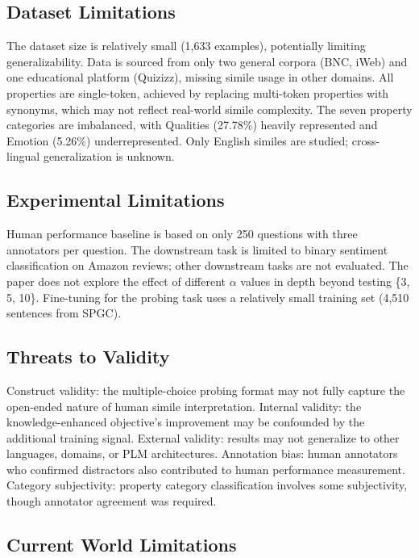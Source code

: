 \documentclass[12pt]{article}
\begin{document}
\subsection{Dataset Limitations}

The dataset size is relatively small (1,633 examples), potentially limiting generalizability. Data is sourced from only two general corpora (BNC, iWeb) and one educational platform (Quizizz), missing simile usage in other domains. All properties are single-token, achieved by replacing multi-token properties with synonyms, which may not reflect real-world simile complexity. The seven property categories are imbalanced, with Qualities (27.78\%) heavily represented and Emotion (5.26\%) underrepresented. Only English similes are studied; cross-lingual generalization is unknown.

\subsection{Experimental Limitations}

Human performance baseline is based on only 250 questions with three annotators per question. The downstream task is limited to binary sentiment classification on Amazon reviews; other downstream tasks are not evaluated. The paper does not explore the effect of different $\alpha$ values in depth beyond testing \{3, 5, 10\}. Fine-tuning for the probing task uses a relatively small training set (4,510 sentences from SPGC).

\subsection{Threats to Validity}

Construct validity: the multiple-choice probing format may not fully capture the open-ended nature of human simile interpretation. Internal validity: the knowledge-enhanced objective's improvement may be confounded by the additional training signal. External validity: results may not generalize to other languages, domains, or PLM architectures. Annotation bias: human annotators who confirmed distractors also contributed to human performance measurement. Category subjectivity: property category classification involves some subjectivity, though annotator agreement was required.

\subsection{Current World Limitations}
\end{document}

